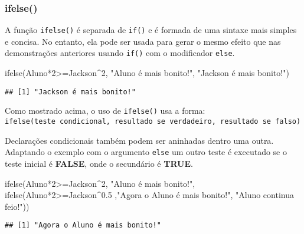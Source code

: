\documentclass[
]{book}
\newenvironment{Shaded}{\begin{snugshade}}{\end{snugshade}}
\newcommand{\DecValTok}[1]{\textcolor[rgb]{0.00,0.00,0.81}{#1}}
\newcommand{\FloatTok}[1]{\textcolor[rgb]{0.00,0.00,0.81}{#1}}
\newcommand{\FunctionTok}[1]{\textcolor[rgb]{0.00,0.00,0.00}{#1}}
\newcommand{\NormalTok}[1]{#1}
\newcommand{\SpecialCharTok}[1]{\textcolor[rgb]{0.00,0.00,0.00}{#1}}
\newcommand{\StringTok}[1]{\textcolor[rgb]{0.31,0.60,0.02}{#1}}
\begin{document}
\hypertarget{ifelse}{%
\subsubsection{ifelse()}\label{ifelse}}

A função \texttt{ifelse()} é separada de \texttt{if()} e é formada de uma sintaxe mais simples e concisa. No entanto, ela pode ser usada para gerar o mesmo efeito que nas demonstrações anteriores usando \texttt{if()} com o modificador \texttt{else}.

\begin{Shaded}
\begin{Highlighting}[]
\FunctionTok{ifelse}\NormalTok{(Aluno}\SpecialCharTok{*}\DecValTok{2}\SpecialCharTok{\textgreater{}=}\NormalTok{Jackson}\SpecialCharTok{\^{}}\DecValTok{2}\NormalTok{, }\StringTok{"Aluno é mais bonito!"}\NormalTok{, }\StringTok{"Jackson é mais bonito!"}\NormalTok{)}
\end{Highlighting}
\end{Shaded}

\begin{verbatim}
## [1] "Jackson é mais bonito!"
\end{verbatim}

Como mostrado acima, o uso de \texttt{ifelse()} usa a forma:
\texttt{ifelse(teste\ condicional,\ resultado\ se\ verdadeiro,\ resultado\ se\ falso)}

Declarações condicionais também podem ser aninhadas dentro uma outra. Adaptando o exemplo com o argumento \texttt{else} um outro teste é executado se o teste inicial é \textbf{FALSE}, onde o secundário é \textbf{TRUE}.

\begin{Shaded}
\begin{Highlighting}[]
\FunctionTok{ifelse}\NormalTok{(Aluno}\SpecialCharTok{*}\DecValTok{2}\SpecialCharTok{\textgreater{}=}\NormalTok{Jackson}\SpecialCharTok{\^{}}\DecValTok{2}\NormalTok{, }\StringTok{"Aluno é mais bonito!"}\NormalTok{,}
       \FunctionTok{ifelse}\NormalTok{(Aluno}\SpecialCharTok{*}\DecValTok{2}\SpecialCharTok{\textgreater{}=}\NormalTok{Jackson}\SpecialCharTok{\^{}}\FloatTok{0.5}\NormalTok{ ,}\StringTok{"Agora o Aluno é mais bonito!"}\NormalTok{, }\StringTok{"Aluno continua feio!"}\NormalTok{))}
\end{Highlighting}
\end{Shaded}

\begin{verbatim}
## [1] "Agora o Aluno é mais bonito!"
\end{verbatim}
\end{document}
